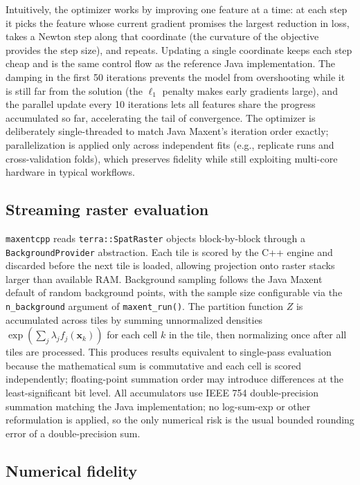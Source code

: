 \documentclass[10pt,letterpaper]{article}
\begin{document}
Intuitively, the optimizer works by improving one feature at a time: at
each step it picks the feature whose current gradient promises the
largest reduction in loss, takes a Newton step along that coordinate
(the curvature of the objective provides the step size), and repeats.
Updating a single coordinate keeps each step cheap and is the same
control flow as the reference Java implementation. The damping in the
first 50 iterations prevents the model from overshooting while it is
still far from the solution (the \(\ell_1\) penalty makes early
gradients large), and the parallel update every 10 iterations lets all
features share the progress accumulated so far, accelerating the tail of
convergence. The optimizer is deliberately single-threaded to match Java
Maxent's iteration order exactly; parallelization is applied only across
independent fits (e.g., replicate runs and cross-validation folds),
which preserves fidelity while still exploiting multi-core hardware in
typical workflows.

\subsection*{Streaming raster
evaluation}

\texttt{maxentcpp} reads \texttt{terra::SpatRaster} objects
block-by-block through a \texttt{BackgroundProvider} abstraction. Each
tile is scored by the C++ engine and discarded before the next tile is
loaded, allowing projection onto raster stacks larger than available
RAM. Background sampling follows the Java Maxent default of random
background points, with the sample size configurable via the
\texttt{n\_background} argument of \texttt{maxent\_run()}. The partition
function \(Z\) is accumulated across tiles by summing unnormalized
densities \(\exp(\sum_j \lambda_j f_j(\mathbf{x}_k))\) for each cell
\(k\) in the tile, then normalizing once after all tiles are processed.
This produces results equivalent to single-pass evaluation because the
mathematical sum is commutative and each cell is scored independently;
floating-point summation order may introduce differences at the
least-significant bit level. All accumulators use IEEE 754
double-precision summation matching the Java implementation; no
log-sum-exp or other reformulation is applied, so the only numerical
risk is the usual bounded rounding error of a double-precision sum.

\subsection*{Numerical fidelity}
\end{document}
